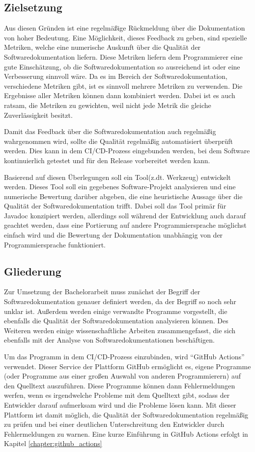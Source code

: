 \subsection{Zielsetzung}
Aus diesen Gründen ist eine regelmäßige Rückmeldung über die Dokumentation von hoher Bedeutung. Eine Möglichkeit, dieses Feedback zu geben, sind spezielle Metriken, welche eine numerische Auskunft über die Qualität der Softwaredokumentation liefern. Diese Metriken liefern dem Programmierer eine gute Einschätzung, ob die Softwaredokumentation so ausreichend ist oder eine Verbesserung sinnvoll wäre. Da es im Bereich der Softwaredokumentation, verschiedene Metriken gibt, ist es sinnvoll mehrere Metriken zu verwenden. Die Ergebnisse aller Metriken können dann kombiniert werden. Dabei ist es auch ratsam, die Metriken zu gewichten, weil nicht jede Metrik die gleiche Zuverlässigkeit besitzt.

Damit das Feedback über die Softwaredokumentation auch regelmäßig wahrgenommen wird, sollte die Qualität regelmäßig automatisiert überprüft werden. Dies kann  in dem \ac{CI/CD}-Prozess eingebunden werden, bei dem Software kontinuierlich getestet und für den Release vorbereitet werden kann. 

Basierend auf diesen Überlegungen soll ein Tool(z.dt. Werkzeug) entwickelt werden. Dieses Tool soll ein gegebenes Software-Projekt analysieren und eine numerische Bewertung darüber abgeben, die eine heuristische Aussage über die Qualität der Softwaredokumentation trifft.  Dabei soll das Tool primär für Javadoc konzipiert werden, allerdings soll während der Entwicklung auch darauf geachtet werden, dass eine Portierung auf andere Programmiersprache möglichst einfach wird und die Bewertung der Dokumentation unabhängig von der Programmiersprache funktioniert.



\subsection{Gliederung}
Zur Umsetzung der Bachelorarbeit muss zunächst der Begriff der Softwaredokumentation genauer definiert werden, da der Begriff so noch sehr unklar ist. Außerdem werden einige verwandte Programme vorgestellt, die ebenfalls die Qualität der Softwaredokumentation analysieren können. Des Weiteren werden einige wissenschaftliche Arbeiten zusammengefasst, die sich ebenfalls mit der Analyse von Softwaredokumentationen beschäftigen. 


Um das Programm in dem \ac{CI/CD}-Prozess einzubinden, wird \enquote{GitHub Actions} verwendet. Dieser Service der Plattform GitHub ermöglicht es, eigene Programme (oder Programme aus einer großen Auswahl von anderen Programmierern) auf den Quelltext auszuführen.  Diese Programme können dann Fehlermeldungen werfen, wenn es irgendwelche Probleme mit dem Quelltext gibt, sodass der Entwickler darauf aufmerksam wird und die Probleme lösen kann. Mit dieser Plattform ist damit möglich, die Qualität der Softwaredokumentation regelmäßig zu prüfen und bei einer deutlichen Unterschreitung den Entwickler durch Fehlermeldungen zu warnen.  Eine kurze Einführung in GitHub Actions erfolgt in Kapitel \ref{chapter:github_actions}

